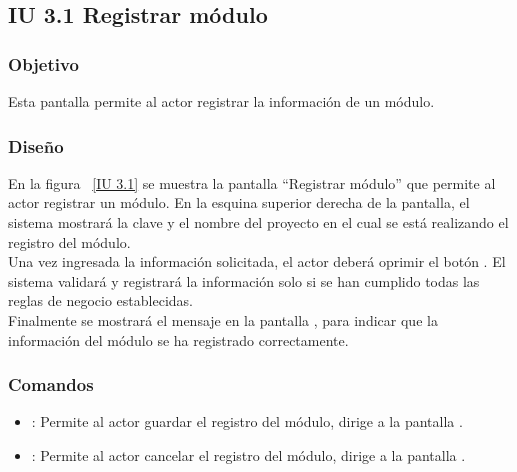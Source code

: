 \newpage 
\subsection{IU 3.1 Registrar módulo}

\subsubsection{Objetivo}
	
    Esta pantalla permite al actor registrar la información de un módulo.

\subsubsection{Diseño}

    En la figura ~\ref{IU 3.1} se muestra la pantalla ``Registrar módulo'' que permite al actor registrar un módulo. En la esquina superior derecha de la pantalla, el sistema mostrará la clave y el nombre del proyecto en el cual se está realizando el registro del módulo.\\

    
    Una vez ingresada la información solicitada, el actor deberá oprimir el botón . El sistema validará y registrará la 
    información solo si se han cumplido todas las reglas de negocio establecidas.  \\
    
    Finalmente se mostrará el mensaje  en la pantalla , 
    para indicar que la información del módulo
    se ha registrado correctamente.\\
	




\subsubsection{Comandos}
\begin{itemize}
	\item {}: Permite al actor guardar el registro del módulo, dirige a la pantalla .
	\item {}: Permite al actor cancelar el registro del módulo, dirige a la pantalla .
\end{itemize}

